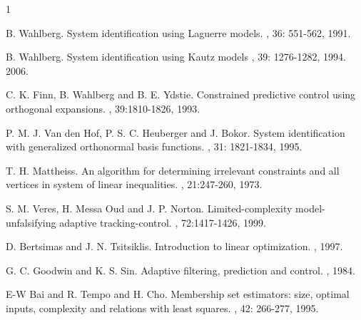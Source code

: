 \documentclass[10 pt, letterpaper]{article}
\begin{document}
\begin{thebibliography}{1}

 B. Wahlberg.
\newblock System identification using {Laguerre} models.
, 36: 551-562, 1991.

 B. Wahlberg.
\newblock System identification using {Kautz} models
, 39: 1276-1282, 1994.
  2006.

 C. K. Finn, B. Wahlberg and B. E. Ydstie.
\newblock Constrained predictive control using orthogonal expansions.
, 39:1810-1826, 1993.

P. M. J. Van den Hof, P. S. C. Heuberger and J. Bokor.
\newblock System identification with generalized orthonormal basis functions.
, 31: 1821-1834, 1995.

 T. H. Mattheiss.
\newblock An algorithm for determining irrelevant constraints and all vertices in system of linear inequalities.
, 21:247-260, 1973.

 S. M. Veres, H. Messa Oud and J. P. Norton.
\newblock Limited-complexity model-unfalsifying adaptive tracking-control.
, 72:1417-1426, 1999.

 D. Bertsimas and J. N. Tsitsiklis.
\newblock Introduction to linear optimization.
, 1997.

G. C. Goodwin and K. S. Sin.
\newblock Adaptive filtering, prediction and control.
, 1984.

 E-W Bai and R. Tempo and H. Cho.
\newblock Membership set estimators: size, optimal inputs, complexity and relations with least squares.
, 42: 266-277, 1995.

\end{thebibliography}
\end{document}
